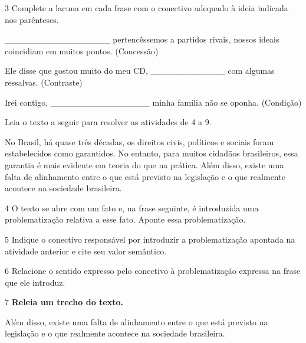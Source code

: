 \num{3} Complete a lacuna em cada frase com o conectivo adequado à ideia
indicada nos parênteses.

\_\_\_\_\_\_\_\_\_\_\_\_\_\_\_\_\_  pertencêssemos a
partidos rivais, nossos ideais coincidiam em muitos pontos. (Concessão)

Ele disse que gostou muito do meu CD,
\_\_\_\_\_\_\_\_\_\_\_\_  com algumas ressalvas. (Contraste)

Irei contigo, \_\_\_\_\_\_\_\_\_\_\_\_\_\_\_\_  minha
família não se oponha. (Condição)


Leia o texto a seguir para resolver as atividades de 4 a 9.

\begin{myquote}
No Brasil, há quase três décadas, os direitos civis, políticos e sociais
foram estabelecidos como garantidos. No entanto, para muitos cidadãos
brasileiros, essa garantia é mais evidente em teoria do que na prática.
Além disso, existe uma falta de alinhamento entre o que está previsto na
legislação e o que realmente acontece na sociedade brasileira.
\end{myquote}


\num{4} O texto se abre com um fato e, na frase seguinte, é introduzida
uma problematização relativa a esse fato. Aponte essa problematização.


\num{5} Indique o conectivo responsável por introduzir a problematização
apontada na atividade anterior e cite seu valor semântico.


\num{6} Relacione o sentido expresso pelo conectivo à problematização
expressa na frase que ele introduz.


\num{7} \textbf{Releia um trecho do texto.}

\begin{myquote}
Além disso, existe uma falta de alinhamento entre o que está previsto na
legislação e o que realmente acontece na sociedade brasileira.
\end{myquote}

